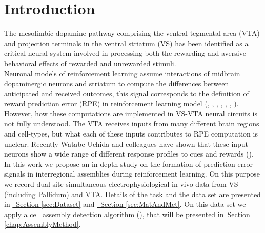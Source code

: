 \chapter{Introduction}
\label{chap:Introduction}
The mesolimbic dopamine pathway comprising the ventral tegmental area (VTA) and projection terminals in the ventral striatum (VS) has been identified as a critical neural system involved in processing both the rewarding and aversive behavioral effects of rewarded and unrewarded stimuli.\\Neuronal models of reinforcement learning assume interactions of midbrain dopaminergic neurons and striatum to compute the differences between anticipated and received outcomes, this signal corresponds to the definition of reward prediction error (RPE) in reinforcement learning model (\cite{Schultz2001}, \cite{Schultz2002}, \cite{Fiorillo}, \cite{Eshel1}, \cite{Pagnoni}, \cite{Radua}, \cite{Takahashi2016}). However, how these computations are implemented in VS-VTA neural circuits is not fully understood. The VTA receives inputs from many different brain regions and cell-types, but what each of these inputs contributes to RPE computation is unclear. Recently Watabe-Uchida and colleagues have shown that these input neurons show a wide range of different response profiles to cues and rewards (\cite{TianHuang}).\\In this work we propose an in depth study on the formation of prediction error signals in interregional assemblies during reinforcement learning. On this purpose we record dual site simultaneous electrophysiological in-vivo data from VS (including Pallidum) and VTA. Details of the task and the data set are presented in \hyperref[sec:Dataset]{~Section \ref*{sec:Dataset}} and \hyperref[sec:MatAndMet]{~Section \ref*{sec:MatAndMet}}. On this data set we apply a cell assembly detection algorithm (\cite{RussoDurstewitz}), that will be presented in\hyperref[chap:AssemblyMethod]{~Section \ref*{chap:AssemblyMethod}}.

